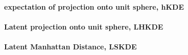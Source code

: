   \paragraph{expectation of projection onto unit sphere, hKDE}

  \paragraph{Latent projection onto unit sphere, LHKDE}

  \paragraph{Latent Manhattan Distance, LSKDE}
  
  






